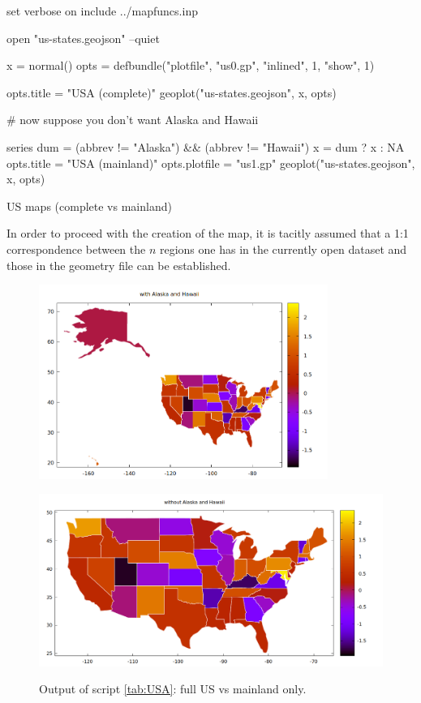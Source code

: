 \documentclass[a4paper]{article}
\begin{document}
\begin{table}[htbp]
  \begin{scode}
set verbose on
include ../mapfuncs.inp

open "us-states.geojson" --quiet

x = normal()
opts = defbundle("plotfile", "us0.gp", "inlined", 1, "show", 1)

opts.title = "USA (complete)"
geoplot("us-states.geojson", x, opts)

# now suppose you don't want Alaska and Hawaii

series dum = (abbrev != "Alaska") && (abbrev != "Hawaii")
x = dum ? x : NA
opts.title = "USA (mainland)"
opts.plotfile = "us1.gp"
geoplot("us-states.geojson", x, opts)
  \end{scode}
  \caption{US maps (complete vs mainland)}
  \label{tab:USA}
\end{table}

In order to proceed with the creation of the map, it is tacitly
assumed that a 1:1 correspondence between the $n$ regions one has in
the currently open dataset and those in the geometry file can be
established.

\begin{figure}[htbp]
  \begin{center}
  \includegraphics[height=180pt]{us0.png}

  \includegraphics[height=180pt]{us1.png}  
\end{center}
\caption{Output of script \ref{tab:USA}: full US vs mainland only.}
\label{fig:USA}
\end{figure}
\end{document}
